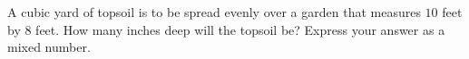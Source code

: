 A cubic yard of topsoil is to be spread evenly over a garden that measures $10$ feet by $8$ feet. How many inches deep will the topsoil be? Express your answer as a mixed number.
